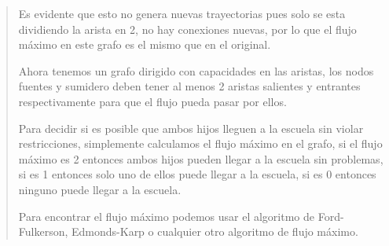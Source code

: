 \begin{quote}
    Es evidente que esto no genera nuevas trayectorias pues solo se esta dividiendo la arista en 2, no hay conexiones nuevas, por lo que el flujo máximo en este grafo es el mismo que en el original. \vspace{.2cm}

    Ahora tenemos un grafo dirigido con capacidades en las aristas, los nodos fuentes y sumidero deben tener al menos 2 aristas salientes y entrantes respectivamente para que el flujo pueda pasar por ellos.  \vspace{.2cm}

    Para decidir si es posible que ambos hijos lleguen a la escuela sin violar restricciones, simplemente calculamos el flujo máximo en el grafo, si el flujo máximo es 2 entonces ambos hijos pueden llegar a la escuela sin problemas, si es 1 entonces solo uno de ellos puede llegar a la escuela, si es 0 entonces ninguno puede llegar a la escuela. \vspace{.2cm}

    Para encontrar el flujo máximo podemos usar el algoritmo de Ford-Fulkerson, Edmonds-Karp o cualquier otro algoritmo de flujo máximo.  \vspace{.2cm}
\end{quote}